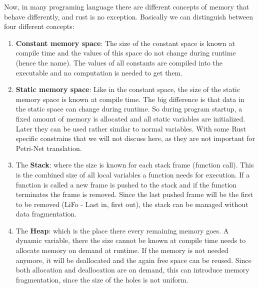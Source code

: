 Now, in many programing language there are different concepts of memory that behave differently, and rust is no exception.
Basically we can distinguish between four different concepts:
\begin{enumerate}
    \item \textbf{Constant memory space}: The size of the constant space is known at compile time and the values of this space do not change during runtime (hence the name).
    The values of all constants are compiled into the executable and no computation is needed to get them.
    \item \textbf{Static memory space}: Like in the constant space, the size of the static memory space is known at compile time.
    The big difference is that data in the static space can change during runtime.
    So during program startup, a fixed amount of memory is allocated and all static variables are initialized.
    Later they can be used rather similar to normal variables. With some Rust specific constrains that we will not discuss here, as they are not important for Petri-Net translation.
    \item The \textbf{Stack}: where the size is known for each stack frame (function call).
    This is the combined size of all local variables a function needs for execution.
    If a function is called a new frame is pushed to the stack and if the function terminates the frame is removed.
    Since the last pushed frame will be the first to be removed (LiFo - Last in, first out), the stack can be managed without data fragmentation.
    \item The \textbf{Heap}: which is the place there every remaining memory goes.
    A dynamic variable, there the size cannot be known at compile time needs to allocate memory on demand at runtime.
    If the memory is not needed anymore, it will be deallocated and the again free space can be reused.
    Since both allocation and deallocation are on demand, this can introduce memory fragmentation, since the size of the holes is not uniform.
\end{enumerate}

